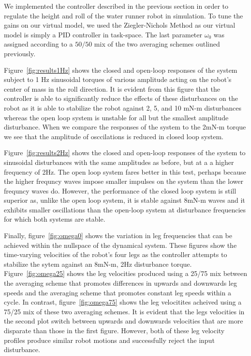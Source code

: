 We implemented the controller described in the previous section in order to regulate the height and roll of the water runner robot in simulation. To tune the gains on our virtual model, we used the Ziegler-Nichols Method as our virtual model is simply a PID controller in task-space. The last parameter $\omega_0$ was assigned according to a $50/50$ mix of the two averaging schemes outlined previously.

Figure~\ref{fig:results1Hz} shows the closed and open-loop responses of the system subject to 1 Hz sinusoidal torques of various amplitude acting on the robot's center of mass in the roll direction. It is evident from this figure that the controller is able to significantly reduce the effects of these disturbances on the robot as it is able to stabilize the robot against 2, 5, and 10 mN-m disturbances whereas the open loop system is unstable for all but the smallest amplitude disturbance. When we compare the responses of the system to the 2mN-m torque we see that the amplitude of osccilations is reduced in closed loop system.

Figure~\ref{fig:results2Hz} shows the closed and open-loop responses of the system to sinusoidal disturbances with the same amplitudes as before, but at a a higher frequency of 2Hz. The open loop system fares better in this test, perhaps because the higher frequncy waves impose smaller impulses on the system than the lower frequncy waves do. However, the performance of the closed loop system is still superior as, unlike the open loop system, it is stable against 8mN-m waves and it exhibits smaller oscillations than the open-loop system at disturbance frequencies for which both systems are stable.

Finally, figure~\ref{fig:omega0} shows the variation in leg frequencies that can be achieved within the nullspace of the dynamical system. These figures show the time-varying velocities of the robot's four legs as the controller attempts to stabilize the sytem against an 8mN-m, 2Hz disturbance torque. Figure~\ref{fig:omega25} shows the leg velocities produced using a 25/75 mix between the averaging scheme that promotes differences in upwards and downwards leg speeds and the averaging scheme that promotes constant leg speeds within a cycle. In contrast, figure~\ref{fig:omega75} shows the leg velocitites acheived using a 75/25 mix of these two averaging schemes. It is evident that the legs velocities in the second plot switch between upwards and downwards velocities that are more disparate than those in the first figure. However, both of these leg velocity profiles produce similar robot motions and successfully reject the input disturbance.

